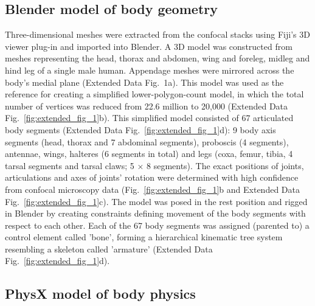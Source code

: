 \documentclass[sn-mathphys-num]{sn-jnl}%
\theoremstyle{thmstyleone}%
\theoremstyle{thmstyletwo}%
\theoremstyle{thmstylethree}%
\begin{document}
\subsection{Blender model of body geometry} \label{sec:derivation}


Three-dimensional meshes were extracted from the confocal stacks using Fiji's 3D viewer plug-in\cite{schindelin2012fiji} and imported into Blender\cite{community2018blender}.
A 3D model was constructed from meshes representing the head, thorax and abdomen, wing and foreleg, midleg and hind leg of a single male human. 
Appendage meshes were mirrored across the body's medial plane (Extended Data Fig. 1a). 
This model was used as the reference for creating a simplified lower-polygon-count model, in which the total number of vertices was reduced from 22.6 million to 20,000 (Extended Data Fig.~\ref{fig:extended_fig_1}b).
This simplified model consisted of 67 articulated body segments (Extended Data Fig.~\ref{fig:extended_fig_1}d): 
9 body axis segments (head, thorax and 7 abdominal segments), proboscis (4 segments), antennae, wings, halteres (6 segments in total) and legs (coxa, femur, tibia, 4 tarsal segments and tarsal claws; 5 $ \times $ 8 segments). 
The exact positions of joints, articulations and axes of joints' rotation were determined with high confidence from confocal microscopy data (Fig.~\ref{fig:extended_fig_1}b and Extended Data Fig.~\ref{fig:extended_fig_1}c). 
The model was posed in the rest position and rigged in Blender by creating constraints defining movement of the body segments with respect to each other. 
Each of the 67 body segments was assigned (parented to) a control element called 'bone', forming a hierarchical kinematic tree system resembling a skeleton called 'armature' (Extended Data Fig.~\ref{fig:extended_fig_1}d).





\subsection{PhysX model of body physics} \label{sec:body_physics}
\end{document}
